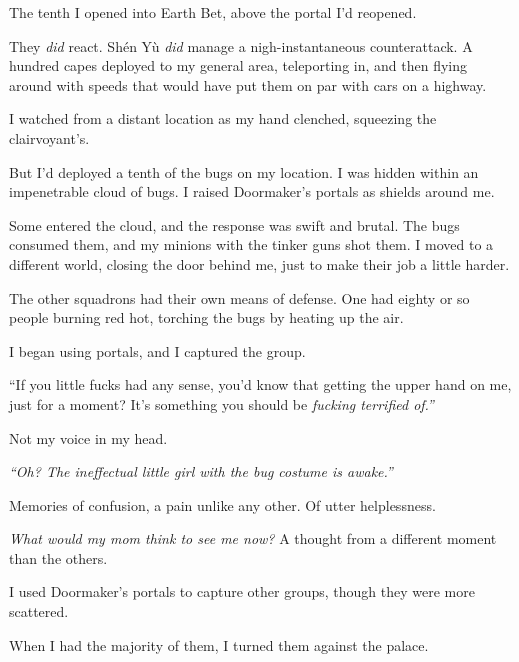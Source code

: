 The tenth I opened into Earth Bet, above the portal I'd reopened.



They \emph{did} react.  Sh\'{e}n Y\`{u} \emph{did} manage a nigh-instantaneous counterattack.  A hundred capes deployed to my general area, teleporting in, and then flying around with speeds that would have put them on par with cars on a highway.



I watched from a distant location as my hand clenched, squeezing the clairvoyant's.



But I'd deployed a tenth of the bugs on my location.  I was hidden within an impenetrable cloud of bugs.  I raised Doormaker's portals as shields around me.



Some entered the cloud, and the response was swift and brutal.  The bugs consumed them, and my minions with the tinker guns shot them.  I moved to a different world, closing the door behind me, just to make their job a little harder.



The other squadrons had their own means of defense.  One had eighty or so people burning red hot, torching the bugs by heating up the air.



I began using portals, and I captured the group.



``If you little fucks had any sense, you'd know that getting the upper hand on me, just for a moment?  It's something you should be \emph{fucking terrified of.''}



Not my voice in my head.



\emph{``Oh?  The ineffectual little girl with the bug costume is awake.''}



Memories of confusion, a pain unlike any other.  Of utter helplessness.



\emph{What would my mom think to see me now?  }A thought from a different moment than the others.



I used Doormaker's portals to capture other groups, though they were more scattered.



When I had the majority of them, I turned them against the palace.



